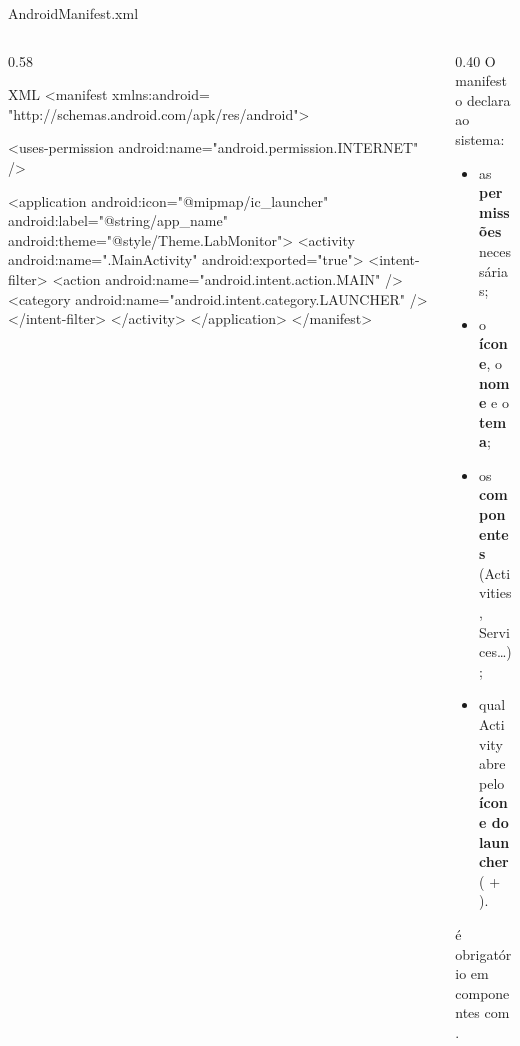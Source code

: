 \documentclass[aspectratio=169,10pt]{beamer}
\begin{document}
\begin{frame}[fragile]{AndroidManifest.xml}
  \begin{columns}[T]
    \begin{column}{0.58\textwidth}
\begin{codigo}[title=app/src/main/AndroidManifest.xml]{XML}
<manifest xmlns:android=
    "http://schemas.android.com/apk/res/android">

  <uses-permission
      android:name="android.permission.INTERNET" />

  <application
      android:icon="@mipmap/ic_launcher"
      android:label="@string/app_name"
      android:theme="@style/Theme.LabMonitor">
    <activity
        android:name=".MainActivity"
        android:exported="true">
      <intent-filter>
        <action android:name="android.intent.action.MAIN" />
        <category android:name="android.intent.category.LAUNCHER" />
      </intent-filter>
    </activity>
  </application>
</manifest>
\end{codigo}
    \end{column}
    \begin{column}{0.40\textwidth}
      \small
      O manifesto declara ao sistema:
      \begin{itemize}
        \item as \textbf{permissões} necessárias;
        \item o \textbf{ícone}, o \textbf{nome} e o \textbf{tema};
        \item os \textbf{componentes} (Activities, Services\ldots);
        \item qual Activity abre pelo \textbf{ícone do launcher} ( + ).
      \end{itemize}
      \begin{atencao}
         é obrigatório em componentes com .
      \end{atencao}
    \end{column}
  \end{columns}
\end{frame}
\end{document}
